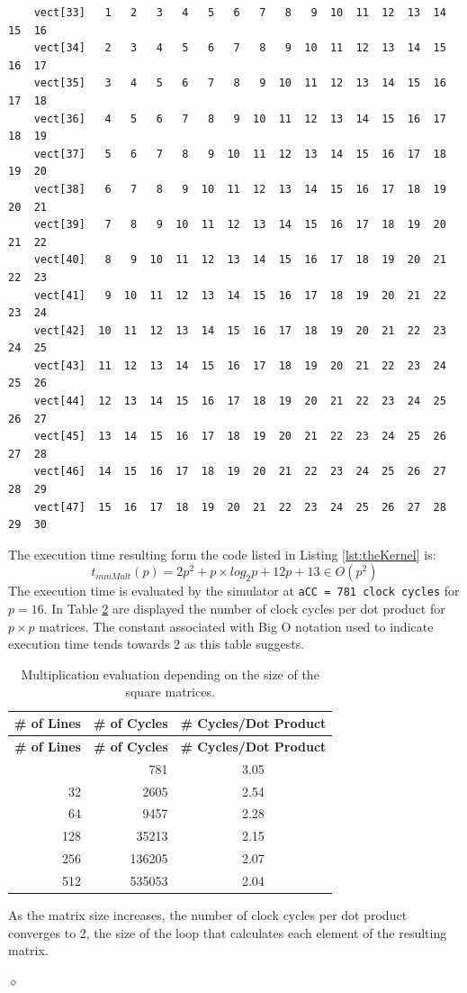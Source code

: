 \begin{exemplu}
{\begin{verbatim}
    vect[33]   1   2   3   4   5   6   7   8   9  10  11  12  13  14  15  16
    vect[34]   2   3   4   5   6   7   8   9  10  11  12  13  14  15  16  17
    vect[35]   3   4   5   6   7   8   9  10  11  12  13  14  15  16  17  18
    vect[36]   4   5   6   7   8   9  10  11  12  13  14  15  16  17  18  19
    vect[37]   5   6   7   8   9  10  11  12  13  14  15  16  17  18  19  20
    vect[38]   6   7   8   9  10  11  12  13  14  15  16  17  18  19  20  21
    vect[39]   7   8   9  10  11  12  13  14  15  16  17  18  19  20  21  22
    vect[40]   8   9  10  11  12  13  14  15  16  17  18  19  20  21  22  23
    vect[41]   9  10  11  12  13  14  15  16  17  18  19  20  21  22  23  24
    vect[42]  10  11  12  13  14  15  16  17  18  19  20  21  22  23  24  25
    vect[43]  11  12  13  14  15  16  17  18  19  20  21  22  23  24  25  26
    vect[44]  12  13  14  15  16  17  18  19  20  21  22  23  24  25  26  27
    vect[45]  13  14  15  16  17  18  19  20  21  22  23  24  25  26  27  28
    vect[46]  14  15  16  17  18  19  20  21  22  23  24  25  26  27  28  29
    vect[47]  15  16  17  18  19  20  21  22  23  24  25  26  27  28  29  30
\end{verbatim}
}

The execution time resulting form the code listed in Listing \ref{lst:theKernel} is: 
$$t_{mmMult}(p) = 2p^2 + p \times log_2 p +12p +13 \in O(p^2)$$
The execution time is evaluated by the simulator at {\tt aCC = 781 clock cycles} for $p = 16$. In Table \ref{tab:mmPerformance} are displayed the number of clock cycles per dot product for $p \times p$ matrices. The constant associated with Big O notation used to indicate execution time tends towards 2 as this table suggests.

\begin{table}[H]
\small
\centering
\begin{longtable}{|r|r|c|}
\caption{Multiplication evaluation depending on the size of the square matrices.}
\label{tab:mmPerformance} \\
\hline
\textbf{\# of Lines} & \textbf{\# of Cycles} & \textbf{\# Cycles/Dot Product} \\
\hline
\endfirsthead
\hline
\textbf{\# of Lines} & \textbf{\# of Cycles} & \textbf{\# Cycles/Dot Product} \\
\hline
\endhead
\hline
\endfoot
\hline
\endlastfoot
16  & 781     & 3.05 \\ \hline
32  & 2605    & 2.54 \\ \hline
64  & 9457    & 2.28 \\ \hline
128 & 35213   & 2.15 \\ \hline
256 & 136205  & 2.07 \\ \hline
512 & 535053  & 2.04 \\ \hline
\end{longtable}
\end{table}

As the matrix size increases, the number of clock cycles per dot product converges to 2, the size of the loop that calculates each element of the resulting matrix.

$\diamond$
\end{exemplu}

